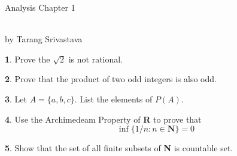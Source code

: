 \documentclass[10pt, twocolumn]{article}
\author{Tarang Srivastava}
\newcommand{\makechaptertitle}[1]{
\begin{center}
	\begin{large}
		#1
	\end{large}
	\begin{small}
		\\by Tarang Srivastava
	\end{small}
\end{center}
}
\theoremstyle{definition}
\newtheorem{q}{}
\begin{document}
		\makechaptertitle{Analysis Chapter 1}
		\begin{q}
			Prove the $ \sqrt{2}$ is not rational.
		\end{q}
		\begin{q}
			Prove that the product of two odd integers is also odd.
		\end{q}
		\begin{q}
			Let $ A = \{ a , b , c \} $. List the elements of $ P(A) $.
		\end{q}
		\begin{q}
			Use the Archimedeam Property of \textbf{R} to prove that
			\[ \inf \{ 1 / n : n \in \mathbf { N } \} = 0 \]
 		\end{q}
 		\begin{q}
 			Show that the set of all finite subsets of \textbf{N} is countable set.
  		\end{q}
		
\end{document}
